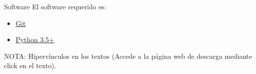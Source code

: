 \begin{frame}[t]{Software}\vspace{10pt}
El software requerido es:
\begin{itemize}
	\item \href{https://git-scm.com/}{Git}
	\item \href{https://www.python.org/}{Python 3.5+}
\end{itemize}
\vspace{10pt}
NOTA: Hipervínculos en los textos (Accede a la página web de descarga mediante click en el texto).
\end{frame}